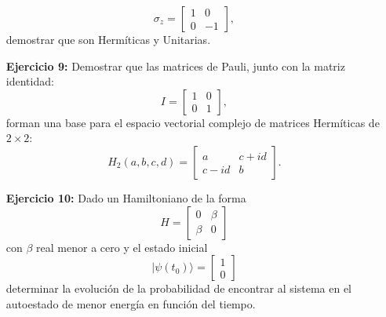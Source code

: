 \documentclass[a4paper,12pt]{article}
\newcommand{\ket}[1]{| #1 \rangle}
\begin{document}
\begin{enumerate}
\begin{equation}
        \sigma_z = \begin{bmatrix}
            1 & 0 \\
            0 & -1 
            \end{bmatrix},
    \end{equation} 
    demostrar que son Hermíticas y Unitarias.
    \item[\bf Ejercicio 9:] 
    Demostrar que las matrices de Pauli, junto con la matriz identidad:
    \begin{equation}
        I = \begin{bmatrix}
            1 & 0 \\
            0 & 1 
            \end{bmatrix},
    \end{equation}forman una base para el espacio vectorial complejo de matrices Hermíticas de $2\times 2$:
    \begin{equation}
    H_2(a,b,c,d) = \begin{bmatrix}
        a & c+id \\
        c-id & b 
        \end{bmatrix}.
    \end{equation}

    \item[\bf Ejercicio 10:] Dado un Hamiltoniano de la forma
    \begin{equation}
        H = \begin{bmatrix}
            0 & \beta \\
            \beta & 0 
            \end{bmatrix}
    \end{equation}
    con $\beta$ real menor a cero y el estado inicial
    \[\ket{\psi(t_0)}=\begin{bmatrix}
        1  \\
        0 
        \end{bmatrix}\]
        determinar la evolución de la probabilidad de encontrar al sistema en el autoestado de menor energía en función del tiempo.


\end{enumerate}
\end{document}
